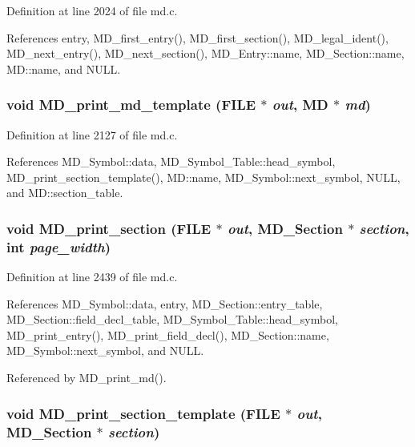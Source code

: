 Definition at line 2024 of file md.c.

References entry, MD\_\-first\_\-entry(), MD\_\-first\_\-section(), MD\_\-legal\_\-ident(), MD\_\-next\_\-entry(), MD\_\-next\_\-section(), MD\_\-Entry::name, MD\_\-Section::name, MD::name, and NULL.
\subsubsection{\setlength{\rightskip}{0pt plus 5cm}void MD\_\-print\_\-md\_\-template (FILE $\ast$ {\em out}, \bf{MD} $\ast$ {\em md})}\label{md_8h_e43e8860ec5bd7831ec8dcbcd9b23cab}




Definition at line 2127 of file md.c.

References MD\_\-Symbol::data, MD\_\-Symbol\_\-Table::head\_\-symbol, MD\_\-print\_\-section\_\-template(), MD::name, MD\_\-Symbol::next\_\-symbol, NULL, and MD::section\_\-table.
\subsubsection{\setlength{\rightskip}{0pt plus 5cm}void MD\_\-print\_\-section (FILE $\ast$ {\em out}, \bf{MD\_\-Section} $\ast$ {\em section}, int {\em page\_\-width})}\label{md_8h_217d18bf9ce0a2e4033baeea403c5943}




Definition at line 2439 of file md.c.

References MD\_\-Symbol::data, entry, MD\_\-Section::entry\_\-table, MD\_\-Section::field\_\-decl\_\-table, MD\_\-Symbol\_\-Table::head\_\-symbol, MD\_\-print\_\-entry(), MD\_\-print\_\-field\_\-decl(), MD\_\-Section::name, MD\_\-Symbol::next\_\-symbol, and NULL.

Referenced by MD\_\-print\_\-md().
\subsubsection{\setlength{\rightskip}{0pt plus 5cm}void MD\_\-print\_\-section\_\-template (FILE $\ast$ {\em out}, \bf{MD\_\-Section} $\ast$ {\em section})}\label{md_8h_5f1363196bcb1701bd18fbceee1495d7}




